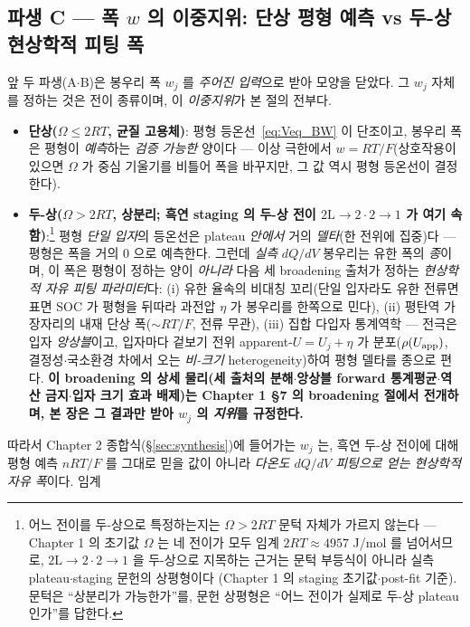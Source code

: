 \subsection{파생 C --- 폭 $w$ 의 이중지위: 단상 평형 예측 vs 두-상 현상학적 피팅 폭}\label{ssec:weff}
앞 두 파생(A$\cdot$B)은 봉우리 폭 $w_j$ 를 \emph{주어진 입력}으로 받아 모양을 닫았다. 그 $w_j$ 자체를 정하는
것은 전이 종류이며, 이 \emph{이중지위}가 본 절의 전부다.
\begin{itemize}[leftmargin=1.4em,itemsep=2pt]
\item \textbf{단상($\Omega\le2RT$, 균질 고용체)}: 평형 등온선~\eqref{eq:Veq_BW} 이 단조이고, 봉우리 폭은 평형이
\emph{예측}하는 \emph{검증 가능한} 양이다 --- 이상 극한에서 $w=RT/F$(상호작용이 있으면 $\Omega$ 가 중심
기울기를 비틀어 폭을 바꾸지만, 그 값 역시 평형 등온선이 결정한다).
\item \textbf{두-상($\Omega>2RT$, 상분리; 흑연 staging 의 두-상 전이 $2\mathrm L\!\to\!2\cdot2\!\to\!1$ 가 여기
속함)}:\footnote{어느 전이를 두-상으로 특정하는지는 $\Omega>2RT$ 문턱 자체가 가르지 않는다 --- Chapter 1 의
초기값 $\Omega$ 는 네 전이가 모두 임계 $2RT\approx4957$ J/mol 를 넘어서므로, $2\mathrm L\!\to\!2\cdot2\!\to\!1$
을 두-상으로 지목하는 근거는 문턱 부등식이 아니라 실측 plateau$\cdot$staging 문헌의 상평형이다
\cite{dahn1991,ohzuku1993}(Chapter 1 의 staging 초기값$\cdot$post-fit 기준). 문턱은 ``상분리가 가능한가''를, 문헌 상평형은 ``어느 전이가 실제로 두-상
plateau 인가''를 답한다.} 평형 \emph{단일 입자}의 등온선은 plateau \emph{안에서} 거의 \emph{델타}(한 전위에 집중)다 --- 평형은
폭을 거의 $0$ 으로 예측한다. 그런데 \emph{실측} $dQ/dV$ 봉우리는 유한 폭의 \emph{종}이며, 이 폭은 평형이 정하는
양이 \emph{아니라} 다음 세 broadening 출처가 정하는 \emph{현상학적 자유 피팅 파라미터}다: (i) 유한 율속의
비대칭 꼬리(단일 입자라도 유한 전류면 표면 SOC 가 평형을 뒤따라 과전압 $\eta$ 가 봉우리를 한쪽으로 민다),
(ii) 평탄역 가장자리의 내재 단상 폭($\sim RT/F$, 전류 무관), (iii) 집합 다입자 통계역학 --- 전극은 입자
\emph{앙상블}이고, 입자마다 겉보기 전위 apparent-$U=U_j+\eta$ 가 분포($\rho(U_{\mathrm{app}})$, 결정성$\cdot$국소환경
차에서 오는 \emph{비-크기} heterogeneity)하여 평형 델타를 종으로 편다. \textbf{이 broadening 의 상세 물리(세
출처의 분해$\cdot$앙상블 forward 통계평균$\cdot$역산 금지$\cdot$입자 크기 효과 배제)는 Chapter 1 §7 의
broadening 절에서 전개하며, 본 장은 그 결과만 받아 $w_j$ 의 \emph{지위}를 규정한다.}
\end{itemize}
따라서 Chapter 2 종합식(\S\ref{sec:synthesis})에 들어가는 $w_j$ 는, 흑연 두-상 전이에 대해 평형 예측
$nRT/F$ 를 그대로 믿을 값이 아니라 \emph{다온도 $dQ/dV$ 피팅으로 얻는 현상학적 자유 폭}이다. 임계
